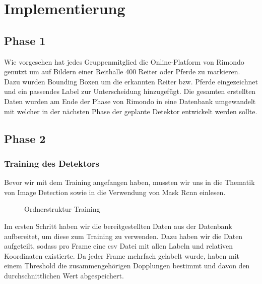\chapter{Implementierung}
\label{ch:implementierung}

\section{Phase 1}
Wie vorgesehen hat jedes Gruppenmitglied die Online-Platform von Rimondo genutzt um auf Bildern einer Reithalle 400 Reiter oder Pferde zu markieren. Dazu wurden Bounding Boxen um  die erkannten Reiter bzw. Pferde eingezeichnet und ein passendes Label zur Unterscheidung hinzugefügt. Die gesamten erstellten Daten wurden am Ende der Phase von Rimondo in eine Datenbank umgewandelt mit welcher in der nächsten Phase der geplante Detektor entwickelt werden sollte.

\section{Phase 2}
\subsection*{Training des Detektors}
Bevor wir mit dem Training angefangen haben, mussten wir uns in die Thematik von Image Detection sowie in die Verwendung von Mask Rcnn einlesen.

\begin{figure}
\caption{Ordnerstruktur Training}
\label{fig:folderstructure}
\end{figure}

Im ersten Schritt haben wir die bereitgestellten Daten aus der Datenbank aufbereitet, um diese zum Training zu verwenden. Dazu haben wir die Daten aufgeteilt, sodass pro Frame eine csv Datei mit allen Labeln und relativen Koordinaten existierte. Da jeder Frame mehrfach gelabelt wurde, haben mit einem Threshold die zusammengehörigen Dopplungen bestimmt und davon den durchschnittlichen Wert abgespeichert. 



